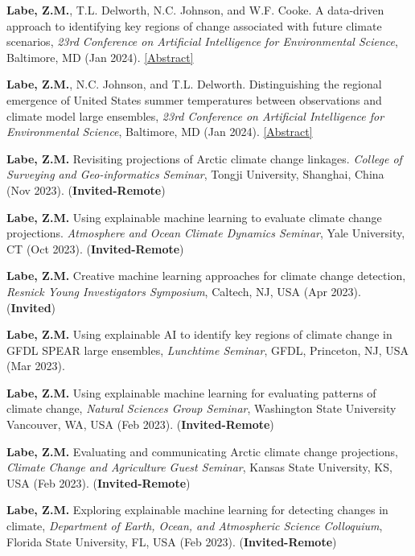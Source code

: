 \documentclass[margin,line,palatino,courier,10pt]{res}
\begin{document}
\begin{resume}
\begin{etaremune}[leftmargin=0in,topsep=0in,parsep=0in]
\item \textbf{Labe, Z.M.}, T.L. Delworth, N.C. Johnson, and W.F. Cooke. A data-driven approach to identifying key regions of change associated with future climate scenarios, \textit{23rd Conference on Artificial Intelligence for Environmental Science}, Baltimore, MD (Jan 2024). \href{https://ams.confex.com/ams/104ANNUAL/meetingapp.cgi/Paper/431300}{[Abstract]}
\item \textbf{Labe, Z.M.}, N.C. Johnson, and T.L. Delworth. Distinguishing the regional emergence of United States summer temperatures between observations and climate model large ensembles, \textit{23rd Conference on Artificial Intelligence for Environmental Science}, Baltimore, MD (Jan 2024). \href{https://ams.confex.com/ams/104ANNUAL/meetingapp.cgi/Paper/431288}{[Abstract]}
\item \textbf{Labe, Z.M.} Revisiting projections of Arctic climate change linkages. \textit{College of Surveying and Geo-informatics Seminar}, Tongji University, Shanghai, China (Nov 2023). (\textbf{Invited-Remote})
\item \textbf{Labe, Z.M.} Using explainable machine learning to evaluate climate change projections. \textit{Atmosphere and Ocean Climate Dynamics Seminar}, Yale University, CT (Oct 2023). (\textbf{Invited-Remote}) 
\item \textbf{Labe, Z.M.} Creative machine learning approaches for climate change detection, \textit{Resnick Young Investigators Symposium}, Caltech, NJ, USA (Apr 2023). (\textbf{Invited}) 
\item \textbf{Labe, Z.M.} Using explainable AI to identify key regions of climate change in GFDL SPEAR large ensembles, \textit{Lunchtime Seminar}, GFDL, Princeton, NJ, USA (Mar 2023). 
\item \textbf{Labe, Z.M.} Using explainable machine learning for evaluating patterns of climate change, \textit{Natural Sciences Group Seminar}, Washington State University Vancouver, WA, USA (Feb 2023). (\textbf{Invited-Remote})
\item \textbf{Labe, Z.M.} Evaluating and communicating Arctic climate change projections, \textit{Climate Change and Agriculture Guest Seminar}, Kansas State University, KS, USA (Feb 2023). (\textbf{Invited-Remote})
\item \textbf{Labe, Z.M.} Exploring explainable machine learning for detecting changes in climate, \textit{Department of Earth, Ocean, and Atmospheric Science Colloquium}, Florida State University, FL, USA (Feb 2023). (\textbf{Invited-Remote})

\end{etaremune}
\end{resume}
\end{document}
